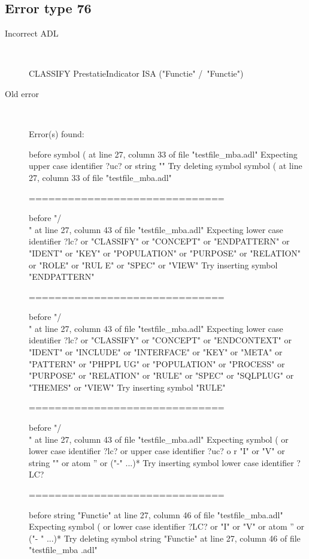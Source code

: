 \hrulefill

\subsection{Error type 76}
  \begin{description}
  \item[Incorrect ADL]~\\
\begin{adl}
CLASSIFY PrestatieIndicator ISA ("Functie" /\ "Functie")\end{adl}
  \item[Old error]~\\
\begin{haskell}
Error(s) found:

before symbol ( at line 27, column 33 of file "testfile_mba.adl"
Expecting upper case identifier ?uc? or string ""
Try deleting symbol symbol ( at line 27, column 33 of file "testfile_mba.adl"

==============================

before "/\\" at line 27, column 43 of file "testfile_mba.adl"
Expecting lower case identifier ?lc? or "CLASSIFY" or "CONCEPT" or "ENDPATTERN"
or "IDENT" or "KEY" or "POPULATION" or "PURPOSE" or "RELATION" or "ROLE" or "RUL
E" or "SPEC" or "VIEW"
Try inserting symbol "ENDPATTERN"

==============================

before "/\\" at line 27, column 43 of file "testfile_mba.adl"
Expecting lower case identifier ?lc? or "CLASSIFY" or "CONCEPT" or "ENDCONTEXT"
or "IDENT" or "INCLUDE" or "INTERFACE" or "KEY" or "META" or "PATTERN" or "PHPPL
UG" or "POPULATION" or "PROCESS" or "PURPOSE" or "RELATION" or "RULE" or "SPEC"
or "SQLPLUG" or "THEMES" or "VIEW"
Try inserting symbol "RULE"

==============================

before "/\\" at line 27, column 43 of file "testfile_mba.adl"
Expecting symbol ( or lower case identifier ?lc? or upper case identifier ?uc? o
r "I" or "V" or string "" or atom '' or ("-" ...)*
Try inserting symbol lower case identifier ?LC?

==============================

before string "Functie" at line 27, column 46 of file "testfile_mba.adl"
Expecting symbol ( or lower case identifier ?LC? or "I" or "V" or atom '' or ("-
" ...)*
Try deleting symbol string "Functie" at line 27, column 46 of file "testfile_mba
.adl"


\end{haskell}
\end{description}
